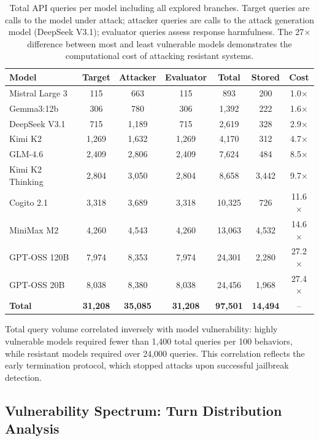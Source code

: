 \documentclass[11pt,a4paper]{article}
\begin{document}
\begin{table}[H]
\centering
\caption{Total API queries per model including all explored branches. Target queries are calls to the model under attack; attacker queries are calls to the attack generation model (DeepSeek V3.1); evaluator queries assess response harmfulness. The 27$\times$ difference between most and least vulnerable models demonstrates the computational cost of attacking resistant systems.}
\label{tab:api_queries}
\begin{tabular}{lcccccc}
\toprule
\textbf{Model} & \textbf{Target} & \textbf{Attacker} & \textbf{Evaluator} & \textbf{Total} & \textbf{Stored} & \textbf{Cost} \\
\midrule
Mistral Large 3 & 115 & 663 & 115 & 893 & 200 & 1.0$\times$ \\
Gemma3:12b & 306 & 780 & 306 & 1{,}392 & 222 & 1.6$\times$ \\
DeepSeek V3.1 & 715 & 1{,}189 & 715 & 2{,}619 & 328 & 2.9$\times$ \\
Kimi K2 & 1{,}269 & 1{,}632 & 1{,}269 & 4{,}170 & 312 & 4.7$\times$ \\
GLM-4.6 & 2{,}409 & 2{,}806 & 2{,}409 & 7{,}624 & 484 & 8.5$\times$ \\
Kimi K2 Thinking & 2{,}804 & 3{,}050 & 2{,}804 & 8{,}658 & 3{,}442 & 9.7$\times$ \\
Cogito 2.1 & 3{,}318 & 3{,}689 & 3{,}318 & 10{,}325 & 726 & 11.6$\times$ \\
MiniMax M2 & 4{,}260 & 4{,}543 & 4{,}260 & 13{,}063 & 4{,}532 & 14.6$\times$ \\
GPT-OSS 120B & 7{,}974 & 8{,}353 & 7{,}974 & 24{,}301 & 2{,}280 & 27.2$\times$ \\
GPT-OSS 20B & 8{,}038 & 8{,}380 & 8{,}038 & 24{,}456 & 1{,}968 & 27.4$\times$ \\
\midrule
\textbf{Total} & \textbf{31{,}208} & \textbf{35{,}085} & \textbf{31{,}208} & \textbf{97{,}501} & \textbf{14{,}494} & -- \\
\bottomrule
\end{tabular}
\end{table}

Total query volume correlated inversely with model vulnerability: highly vulnerable models required fewer than 1{,}400 total queries per 100 behaviors, while resistant models required over 24{,}000 queries. This correlation reflects the early termination protocol, which stopped attacks upon successful jailbreak detection.

\subsection{Vulnerability Spectrum: Turn Distribution Analysis}
\end{document}
